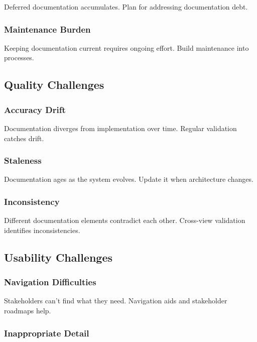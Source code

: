\documentclass[11pt]{article}
\begin{document}
Deferred documentation accumulates. Plan for addressing documentation debt.

\subsubsection{Maintenance Burden}

Keeping documentation current requires ongoing effort. Build maintenance into processes.

\subsection{Quality Challenges}

\subsubsection{Accuracy Drift}

Documentation diverges from implementation over time. Regular validation catches drift.

\subsubsection{Staleness}

Documentation ages as the system evolves. Update it when architecture changes.

\subsubsection{Inconsistency}

Different documentation elements contradict each other. Cross-view validation identifies inconsistencies.

\subsection{Usability Challenges}

\subsubsection{Navigation Difficulties}

Stakeholders can't find what they need. Navigation aids and stakeholder roadmaps help.

\subsubsection{Inappropriate Detail}
\end{document}

